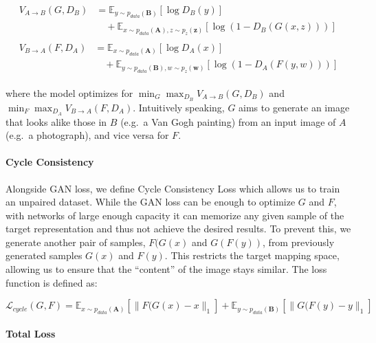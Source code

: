 \documentclass[12pt,a4paper,]{report}
\begin{document}
\begin{align}
    \begin{split}
        V_{A \rightarrow B}(G, D_B) &= \mathbb{E}_{y \sim p_{data}(\mathbf{B})}[ \log D_B(y)]  \\
        &\quad + \mathbb{E}_{x \sim p_{data}(\mathbf{A}), z \sim p_{z}(\mathbf{z})} [\log (1 - D_B(G(x, z)))] \label{eq:cyclegan_1}
    \end{split} \\
    \begin{split}
        V_{B \rightarrow A}(F, D_A) &= \mathbb{E}_{x \sim p_{data}(\mathbf{A})}[ \log D_A(x)]  \\
        &\quad + \mathbb{E}_{y \sim p_{data}(\mathbf{B}), w \sim p_{z}(\mathbf{w})} [\log (1 - D_A(F(y, w)))] \label{eq:cyclegan_2}
    \end{split} 
\end{align}

where the model optimizes for
\(\displaystyle \min_G \max_{D_B} V_{A \rightarrow B}(G, D_B)\) and
\(\displaystyle \min_F \max_{D_A} V_{B \rightarrow A}(F, D_A)\).
Intuitively speaking, \(G\) aims to generate an image that looks alike
those in \(B\) (e.g.~a Van Gogh painting) from an input image of \(A\)
(e.g.~a photograph), and vice versa for \(F\).

\paragraph{Cycle Consistency}

Alongside GAN loss, we define Cycle Consistency Loss which allows us to
train an unpaired dataset. While the GAN loss can be enough to optimize
\(G\) and \(F\), with networks of large enough capacity it can memorize
any given sample of the target representation and thus not achieve the
desired results. To prevent this, we generate another pair of samples,
\(F(G(x)\) and \(G(F(y))\), from previously generated samples \(G(x)\)
and \(F(y)\). This restricts the target mapping space, allowing us to
ensure that the ``content'' of the image stays similar. The loss
function is defined as:

\begin{equation}
    \mathcal{L}_{cycle}(G, F) = \mathbb{E}_{x \sim p_{data}(\mathbf{A})}[\|F(G(x) - x\|_1] + \mathbb{E}_{y \sim p_{data}(\mathbf{B})}[\|G(F(y) - y\|_1]
\end{equation}

\paragraph{Total Loss}
\end{document}
